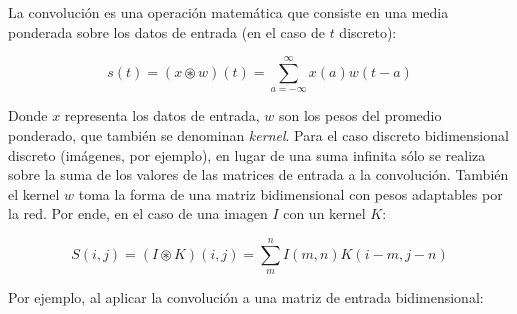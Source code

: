 \documentclass[spanish]{article}
\begin{document}
La convolución es una operación matemática que consiste en una media ponderada sobre
los datos de entrada (en el caso de \(t\) discreto):

\[s(t) = (x \circledast w)(t) = \sum_{a = -\infty}^{\infty} x(a)w(t-a) \]

Donde \(x\) representa los datos de entrada, \(w\) son los pesos del promedio
ponderado, que también se denominan \textit{kernel}.
Para el caso discreto bidimensional discreto (imágenes, por ejemplo), en lugar de
una suma infinita sólo se realiza sobre la suma de los valores de las matrices de
entrada a la convolución. También el kernel \(w\) toma la forma de una matriz
bidimensional con pesos adaptables por la red. Por ende, en el caso de una imagen
\(I\) con un kernel \(K\):

\[S(i,j)=(I \circledast K)(i,j)=\sum_{m}^{n} I(m,n)K(i-m,j-n)\]

Por ejemplo, al aplicar la convolución a una matriz de entrada bidimensional:
\end{document}
